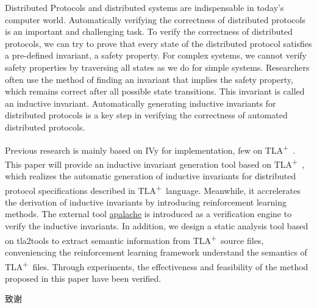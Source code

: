 \documentclass[
    type = bachelor,
    degree = academic,
    twoside,
    fontset = win,
    decl-page
]
{njuthesis}
\newcommand{\TLA}{TLA\textsuperscript{+}\ }
\begin{document}
\begin{abstract*}
    Distributed Protocols and distributed systems are indispensable in today's computer world. Automatically verifying the correctness of distributed protocols is an important and challenging task.
    To verify the correctness of distributed protocols, we can try to prove that every state of the distributed protocol satisfies a pre-defined invariant, a safety property.
    For complex systems, we cannot verify safety properties by traversing all states as we do for simple systems.
    Researchers often use the method of finding an invariant that implies the safety property, which remains correct after all possible state transitions. This invariant is called an inductive invariant.
    Automatically generating inductive invariants for distributed protocols is a key step in verifying the correctness of automated distributed protocols.

    Previous research is mainly based on IVy for implementation, few on \TLA. 
    This paper will provide an inductive invariant generation tool based on \TLA, which realizes the automatic generation of inductive invariants for distributed protocol specifications described in \TLA language.
    Meanwhile, it accrelerates the derivation of inductive invariants by introducing reinforcement learning methods.
    The external tool \href{https://apalache.informal.systems/}{apalache} is introduced as a verification engine to verify the inductive invariants.
    In addition, we design a static analysis tool based on tla2tools to extract semantic information from \TLA source files, conveniencing the reinforcement learning framework understand the semantics of \TLA files.
    Through experiments, the effectiveness and feasibility of the method proposed in this paper have been verified.
\end{abstract*}

\tableofcontents

\mainmatter


\printbibliography

\begin{acknowledgement}
    致谢
\end{acknowledgement}
\end{document}
